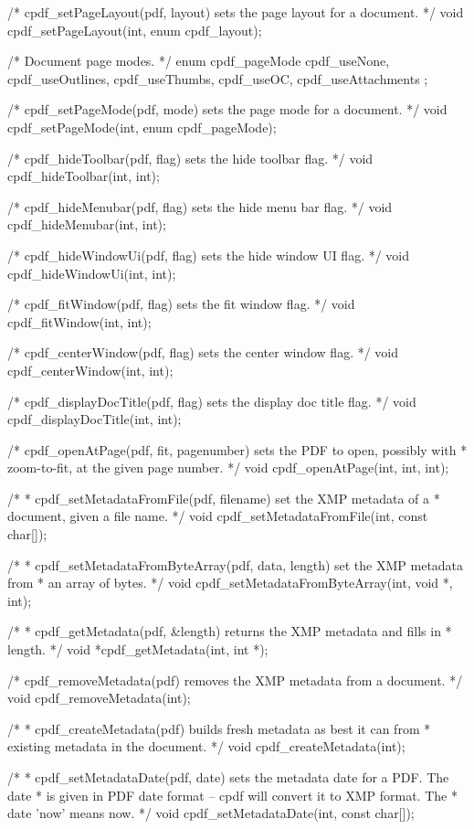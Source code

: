 /* cpdf_setPageLayout(pdf, layout) sets the page layout for a document. */
void cpdf_setPageLayout(int, enum cpdf_layout);

/* Document page modes. */
enum cpdf_pageMode {
  cpdf_useNone,
  cpdf_useOutlines,
  cpdf_useThumbs,
  cpdf_useOC,
  cpdf_useAttachments
};

/* cpdf_setPageMode(pdf, mode) sets the page mode for a document. */
void cpdf_setPageMode(int, enum cpdf_pageMode);

/* cpdf_hideToolbar(pdf, flag) sets the hide toolbar flag. */
void cpdf_hideToolbar(int, int);

/* cpdf_hideMenubar(pdf, flag) sets the hide menu bar flag. */
void cpdf_hideMenubar(int, int);

/* cpdf_hideWindowUi(pdf, flag) sets the hide window UI flag. */
void cpdf_hideWindowUi(int, int);

/* cpdf_fitWindow(pdf, flag) sets the fit window flag. */
void cpdf_fitWindow(int, int);

/* cpdf_centerWindow(pdf, flag) sets the center window flag. */
void cpdf_centerWindow(int, int);

/* cpdf_displayDocTitle(pdf, flag) sets the display doc title flag. */
void cpdf_displayDocTitle(int, int);

/* cpdf_openAtPage(pdf, fit, pagenumber) sets the PDF to open, possibly with
 * zoom-to-fit, at the given page number. */
void cpdf_openAtPage(int, int, int);

/*
 * cpdf_setMetadataFromFile(pdf, filename) set the XMP metadata of a
 * document, given a file name.
 */
void cpdf_setMetadataFromFile(int, const char[]);

/*
 * cpdf_setMetadataFromByteArray(pdf, data, length) set the XMP metadata from
 * an array of bytes.
 */
void cpdf_setMetadataFromByteArray(int, void *, int);

/*
 * cpdf_getMetadata(pdf, &length) returns the XMP metadata and fills in
 * length.
 */
void *cpdf_getMetadata(int, int *);

/* cpdf_removeMetadata(pdf) removes the XMP metadata from a document. */
void cpdf_removeMetadata(int);

/*
 * cpdf_createMetadata(pdf) builds fresh metadata as best it can from
 * existing metadata in the document.
 */
void cpdf_createMetadata(int);

/*
 * cpdf_setMetadataDate(pdf, date) sets the metadata date for a PDF. The date
 * is given in PDF date format -- cpdf will convert it to XMP format. The
 * date 'now' means now.
 */
void cpdf_setMetadataDate(int, const char[]);

